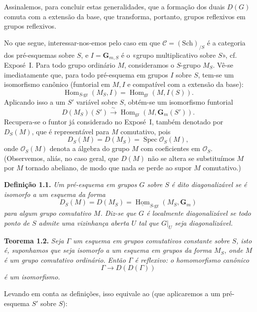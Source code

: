 Assinalemos, para concluir estas generalidades, que a formação dos duais
\(D(G)\) comuta com a extensão da base, que transforma, portanto,
grupos reflexivos em grupos reflexivos.

No que segue, interessar-nos-emos pelo caso em que
\(\mathscr C=(\mathrm{Sch})_{/S}\) é a categoria dos pré-esquemas sobre
\(S\), e \(I=\mathbf G_{m,S}\) é o «grupo multiplicativo sobre \(S\)»,
cf. Exposé~I. Para todo grupo ordinário \(M\), consideramos o
\(S\)-grupo \(M_S\). Vê-se imediatamente que, para todo pré-esquema em
grupos \(I\) sobre \(S\), tem-se um isomorfismo canônico
(funtorial em \(M,I\) e compatível com a extensão da base):
\[
  \operatorname{Hom}_{S\text{-}\mathrm{gr}}(M_S,I)
  =\operatorname{Hom}_{\mathrm{gr}}(M,I(S)).
\]
Aplicando isso a um \(S'\) variável sobre \(S\), obtém-se um isomorfismo
funtorial
\[
  D(M_S)(S')\xrightarrow{\ \sim\ }
  \operatorname{Hom}_{\mathrm{gr}}(M,\mathbf G_m(S')).
\]
Recupera-se o funtor já considerado no Exposé~I, também denotado por
\(D_S(M)\), que é representável para \(M\) comutativo, pois
\[
  D_S(M)=D(M_S)=\operatorname{Spec}\mathscr O_S(M),
\]
onde \(\mathscr O_S(M)\) denota a álgebra do grupo \(M\) com
coeficientes em \(\mathscr O_S\). (Observemos, aliás, no caso geral,
que \(D(M)\) não se altera se substituímos \(M\) por \(M\) tornado
abeliano, de modo que nada se perde ao supor \(M\) comutativo.)

\medskip
\noindent{}\textbf{Definição 1.1.}
\textit{Um pré-esquema em grupos \(G\) sobre \(S\) é dito
\emph{diagonalizável} se é isomorfo a um esquema da forma}
\[
  D_S(M)=D(M_S)
  =\underline{\operatorname{Hom}}_{S\text{-}\mathrm{gr}}(M_S,\mathbf G_m)
\]
\textit{para algum grupo comutativo \(M\). Diz-se que \(G\) é
\emph{localmente diagonalizável} se todo ponto de \(S\) admite uma vizinhança
aberta \(U\) tal que \(G|_U\) seja diagonalizável.}

\medskip
\noindent{}\textbf{Teorema 1.2.}
\textit{Seja \(\Gamma\) um esquema em grupos comutativos constante sobre
\(S\), isto é, suponhamos que seja isomorfo a um esquema em grupos da
forma \(M_S\), onde \(M\) é um grupo comutativo ordinário. Então
\(\Gamma\) é reflexivo: o homomorfismo canônico}
\[
  \Gamma\longrightarrow D(D(\Gamma))
\]
\textit{é um isomorfismo.}

Levando em conta as definições, isso equivale ao
 (que aplicaremos
a um pré-esquema \(S'\) sobre \(S\)):


